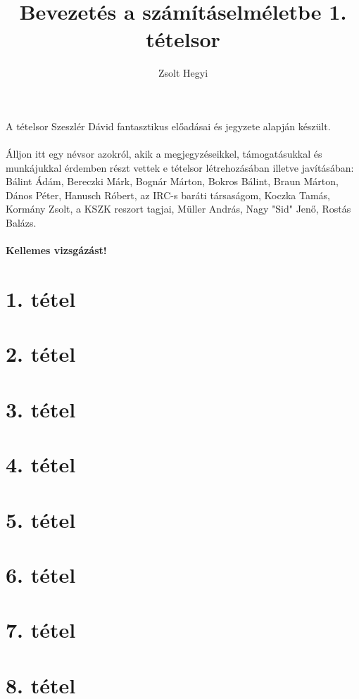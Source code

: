 \documentclass[]{article}
\title{Bevezetés a számításelméletbe 1. tételsor}
\author{Zsolt Hegyi}
\date{}
\begin{document}
\maketitle
\noindent A tételsor Szeszlér Dávid fantasztikus előadásai és jegyzete alapján készült.
\\
\\
\noindent Álljon itt egy névsor azokról, akik a megjegyzéseikkel, támogatásukkal és munkájukkal érdemben részt vettek e tételsor létrehozásában illetve javításában:
\\
\indent Bálint Ádám, Bereczki Márk, Bognár Márton, Bokros Bálint, Braun Márton, Dános Péter, Hanusch Róbert, az IRC-s baráti társaságom, Koczka Tamás, Kormány Zsolt, a KSZK reszort tagjai, Müller András, Nagy "Sid" Jenő, Rostás Balázs.
\\
\\
\noindent \textbf{Kellemes vizsgázást!} %
\tableofcontents{}
\newpage
\section{1. tétel}

\newpage
\section{2. tétel}

\newpage
\section{3. tétel}

\newpage
\section{4. tétel}

\newpage
\section{5. tétel}

\newpage
\section{6. tétel}

\newpage
\section{7. tétel}

\newpage
\section{8. tétel}

\newpage
\end{document}

